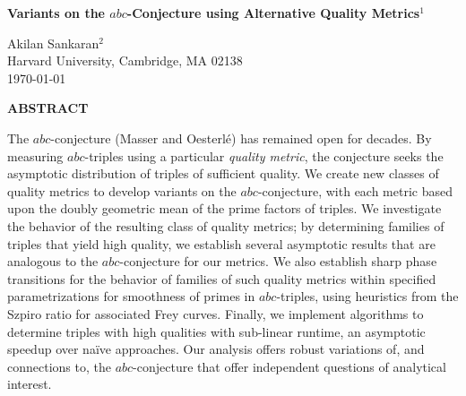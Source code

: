 \documentclass[11pt,letterpaper]{amsart}
\begin{document}
  \begin{center}
    \vspace*{-1.0em}
    {\Large \bfseries Variants on the $abc$-Conjecture using Alternative Quality Metrics$^{1}$}\\
    \vspace{0.8em}
    
    {\large Akilan Sankaran$^{2}$}\\
    \vspace{0.3em}
    {\small Harvard University, Cambridge, MA 02138}\\
    \vspace{0.6em}
    {\small \today}\\
    \vspace{1.2em} 

    {\normalsize\bfseries\scshape {ABSTRACT}}
    \vspace{0.4em}
    
    \begin{minipage}{0.92\textwidth}
      \small
      The $abc$-conjecture (Masser and Oesterl\'e) has remained open for decades. By measuring $abc$-triples using a particular \textit{quality metric}, the conjecture seeks the asymptotic distribution of triples of sufficient quality. We create new classes of quality metrics to develop variants on the $abc$-conjecture, with each metric based upon the doubly geometric mean of the prime factors of triples. We investigate the behavior of the resulting class of quality metrics; by determining families of triples that yield high quality, we establish several asymptotic results that are analogous to the $abc$-conjecture for our metrics. We also establish sharp phase transitions for the behavior of families of such quality metrics within specified parametrizations for smoothness of primes in $abc$-triples, using heuristics from the Szpiro ratio for associated Frey curves. Finally, we implement algorithms to determine triples with high qualities with sub-linear runtime, an asymptotic speedup over naïve approaches. Our analysis offers robust variations of, and connections to, the $abc$-conjecture that offer independent questions of analytical interest.
    \end{minipage}
    \vspace{2em} 
  \end{center}

\setcounter{footnote}{2}
\end{document}
